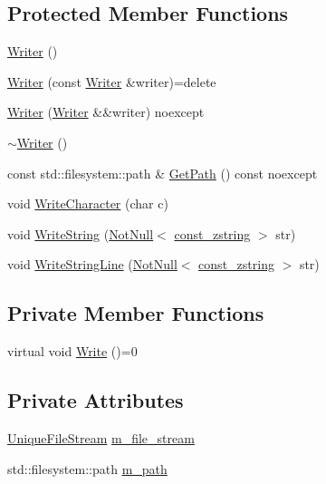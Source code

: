 \subsection*{Protected Member Functions}
\begin{DoxyCompactItemize}
\item 
\mbox{\hyperlink{classmage_1_1_writer_a40b6cd3005d509e670c5a49272d9ef27}{Writer}} ()
\item 
\mbox{\hyperlink{classmage_1_1_writer_a2b257938508732ca0b78241aafa7922c}{Writer}} (const \mbox{\hyperlink{classmage_1_1_writer}{Writer}} \&writer)=delete
\item 
\mbox{\hyperlink{classmage_1_1_writer_abda6f6db577201580c0e97c0816e0d3f}{Writer}} (\mbox{\hyperlink{classmage_1_1_writer}{Writer}} \&\&writer) noexcept
\item 
\mbox{\hyperlink{classmage_1_1_writer_aeeb30d6afb1a271b4ad294889054caec}{$\sim$\+Writer}} ()
\item 
const std\+::filesystem\+::path \& \mbox{\hyperlink{classmage_1_1_writer_ab023ae8174132f233c6e1fa4d3a2a1c8}{Get\+Path}} () const noexcept
\item 
void \mbox{\hyperlink{classmage_1_1_writer_aa1ef04f5e69c44afda56704c2823316c}{Write\+Character}} (char c)
\item 
void \mbox{\hyperlink{classmage_1_1_writer_a0efdf73186727b2ae95072b62eddcf5b}{Write\+String}} (\mbox{\hyperlink{namespacemage_a8769f9d670d6b585ea306cb1062af94b}{Not\+Null}}$<$ \mbox{\hyperlink{namespacemage_abfd9206dc607ceb5d13ec68bf075a5c0}{const\+\_\+zstring}} $>$ str)
\item 
void \mbox{\hyperlink{classmage_1_1_writer_abdfd1361df7bb66e284d031f92c85c05}{Write\+String\+Line}} (\mbox{\hyperlink{namespacemage_a8769f9d670d6b585ea306cb1062af94b}{Not\+Null}}$<$ \mbox{\hyperlink{namespacemage_abfd9206dc607ceb5d13ec68bf075a5c0}{const\+\_\+zstring}} $>$ str)
\end{DoxyCompactItemize}
\subsection*{Private Member Functions}
\begin{DoxyCompactItemize}
\item 
virtual void \mbox{\hyperlink{classmage_1_1_writer_a9baf695ef7f6180bef883f60bcb3ac07}{Write}} ()=0
\end{DoxyCompactItemize}
\subsection*{Private Attributes}
\begin{DoxyCompactItemize}
\item 
\mbox{\hyperlink{namespacemage_a5b2330d3c47b5c1f02bc25e035f74f81}{Unique\+File\+Stream}} \mbox{\hyperlink{classmage_1_1_writer_ac4884215d1b547e990633474bf61c470}{m\+\_\+file\+\_\+stream}}
\item 
std\+::filesystem\+::path \mbox{\hyperlink{classmage_1_1_writer_a1cc2c110c2652818a7bfdccc8c240fe6}{m\+\_\+path}}
\end{DoxyCompactItemize}


